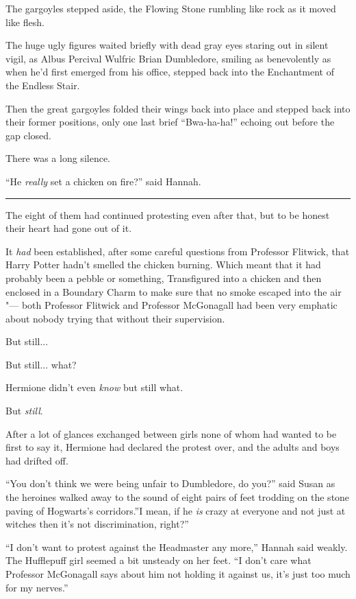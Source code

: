 The gargoyles stepped aside, the Flowing Stone rumbling like rock as it
moved like flesh.

The huge ugly figures waited briefly with dead gray eyes staring out in
silent vigil, as Albus Percival Wulfric Brian Dumbledore, smiling as
benevolently as when he'd first emerged from his office, stepped back
into the Enchantment of the Endless Stair.

Then the great gargoyles folded their wings back into place and stepped
back into their former positions, only one last brief ``Bwa-ha-ha!''
echoing out before the gap closed.

There was a long silence.

``He \emph{really} set a chicken on fire?'' said Hannah.

\begin{center}\rule{3in}{0.4pt}\end{center}

The eight of them had continued protesting even after that, but to be
honest their heart had gone out of it.

It \emph{had} been established, after some careful questions from
Professor Flitwick, that Harry Potter hadn't smelled the chicken
burning. Which meant that it had probably been a pebble or something,
Transfigured into a chicken and then enclosed in a Boundary Charm to
make sure that no smoke escaped into the air "--- both Professor Flitwick
and Professor McGonagall had been very emphatic about nobody trying that
without their supervision.

But still...

But still... what?

Hermione didn't even \emph{know} but still what.

But \emph{still}.

After a lot of glances exchanged between girls none of whom had wanted
to be first to say it, Hermione had declared the protest over, and the
adults and boys had drifted off.

``You don't think we were being unfair to Dumbledore, do you?'' said
Susan as the heroines walked away to the sound of eight pairs of feet
trodding on the stone paving of Hogwarts's corridors.''I mean, if he
\emph{is} crazy at everyone and not just at witches then it's not
discrimination, right?''

``I don't want to protest against the Headmaster any more,'' Hannah said
weakly. The Hufflepuff girl seemed a bit unsteady on her feet. ``I don't
care what Professor McGonagall says about him not holding it against us,
it's just too much for my nerves.''

